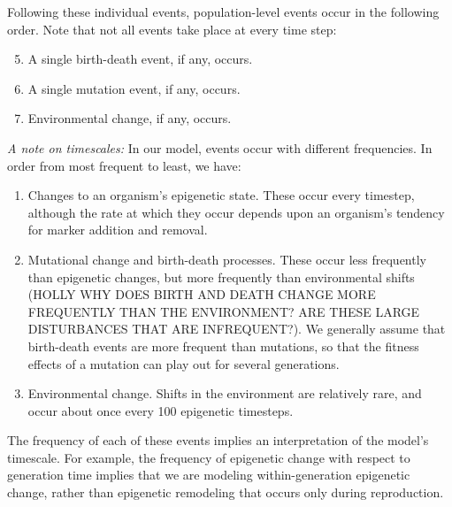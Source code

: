 \documentclass{article}
\begin{document}
Following these individual events, population-level events occur in the following order. Note that not all events take place at every time step:
\begin{enumerate}
  \setcounter{enumi}{4}
    \item A single birth-death event, if any, occurs.
    \item A single mutation event, if any, occurs.
    \item Environmental change, if any, occurs.
\end{enumerate}

\textit{A note on timescales:} In our model, events occur with different frequencies. In order from most frequent to least, we have:
\begin{enumerate}
    \item Changes to an organism's epigenetic state. These occur every timestep, although the rate at which they occur depends upon an organism's tendency for marker addition and removal.

    \item Mutational change and birth-death processes. These occur less frequently than epigenetic changes, but more frequently than environmental shifts (HOLLY WHY DOES BIRTH AND DEATH CHANGE MORE FREQUENTLY THAN THE ENVIRONMENT? ARE THESE LARGE DISTURBANCES THAT ARE INFREQUENT?). We generally assume that birth-death events are more frequent than mutations, so that the fitness effects of a mutation can play out for several generations.

    \item Environmental change. Shifts in the environment are relatively rare, and occur about once every 100 epigenetic timesteps. 
\end{enumerate}

The frequency of each of these events implies an interpretation of the model's timescale. For example, the frequency of epigenetic change with respect to generation time implies that we are modeling within-generation epigenetic change, rather than epigenetic remodeling that occurs only during reproduction.
\end{document}
